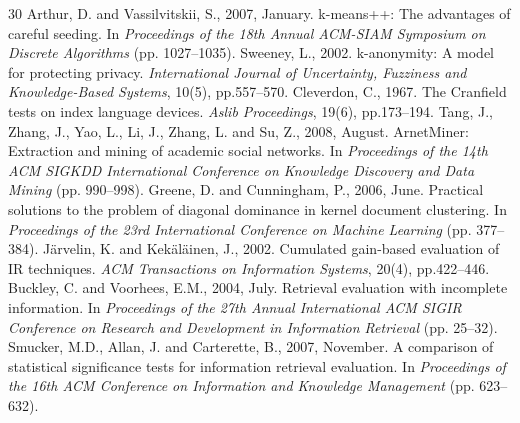 \documentclass[conference]{IEEEtran}
\begin{document}
\begin{thebibliography}{30}
 Arthur, D. and Vassilvitskii, S., 2007, January. k-means++: The advantages of careful seeding. In \textit{Proceedings of the 18th Annual ACM-SIAM Symposium on Discrete Algorithms} (pp. 1027--1035).
 Sweeney, L., 2002. k-anonymity: A model for protecting privacy. \textit{International Journal of Uncertainty, Fuzziness and Knowledge-Based Systems}, 10(5), pp.557--570.
 Cleverdon, C., 1967. The Cranfield tests on index language devices. \textit{Aslib Proceedings}, 19(6), pp.173--194.
 Tang, J., Zhang, J., Yao, L., Li, J., Zhang, L. and Su, Z., 2008, August. ArnetMiner: Extraction and mining of academic social networks. In \textit{Proceedings of the 14th ACM SIGKDD International Conference on Knowledge Discovery and Data Mining} (pp. 990--998).
 Greene, D. and Cunningham, P., 2006, June. Practical solutions to the problem of diagonal dominance in kernel document clustering. In \textit{Proceedings of the 23rd International Conference on Machine Learning} (pp. 377--384).
 J\"arvelin, K. and Kek\"al\"ainen, J., 2002. Cumulated gain-based evaluation of IR techniques. \textit{ACM Transactions on Information Systems}, 20(4), pp.422--446.
 Buckley, C. and Voorhees, E.M., 2004, July. Retrieval evaluation with incomplete information. In \textit{Proceedings of the 27th Annual International ACM SIGIR Conference on Research and Development in Information Retrieval} (pp. 25--32).
 Smucker, M.D., Allan, J. and Carterette, B., 2007, November. A comparison of statistical significance tests for information retrieval evaluation. In \textit{Proceedings of the 16th ACM Conference on Information and Knowledge Management} (pp. 623--632).
\end{thebibliography}
\end{document}
